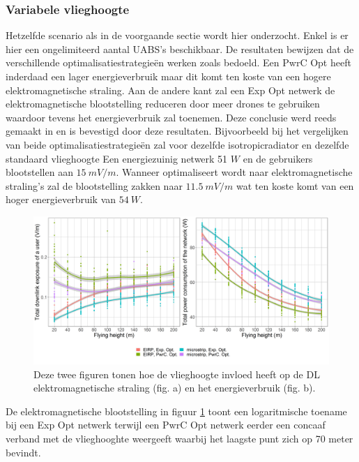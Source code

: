 \documentclass[twocolumn]{phdsymp_dutch}
\begin{document}
\subsubsection{Variabele vlieghoogte}
Hetzelfde scenario als in de voorgaande sectie wordt hier onderzocht. Enkel is er hier een ongelimiteerd aantal 
\gls{UABS}'s beschikbaar. De resultaten bewijzen dat de verschillende optimalisatiestrategie\"en werken zoals bedoeld.
Een \gls{PwrC Opt} heeft inderdaad een lager energieverbruik maar dit komt ten koste van een hogere elektromagnetische straling.
Aan de andere kant zal een  \gls{Exp Opt} netwerk de elektromagnetische blootstelling reduceren door meer drones te gebruiken waardoor tevens 
het energieverbruik zal toenemen. Deze conclusie werd reeds gemaakt in \cite{J1} en is bevestigd door deze resultaten.
Bijvoorbeeld bij het vergelijken van beide optimalisatiestrategieën zal voor dezelfde
\gls{isotropicradiator} en dezelfde standaard vlieghoogte Een energiezuinig netwerk 51 $W$ 
en de gebruikers blootstellen aan $15\ mV/m$.
Wanneer optimaliseert wordt naar elektromagnetische straling's zal de blootstelling zakken naar 
$11.5\ mV/m$ wat ten koste komt van een hoger energieverbruik van $54\ W$.


\begin{figure}[h!]
  \includegraphics[width=\linewidth]{../results/s3/fhvsdlAndPc.png}
  \caption{Deze twee figuren tonen hoe de vlieghoogte invloed heeft op de \acs{DL} elektromagnetische straling (fig. a) en het energieverbruik (fig. b).}
  \label{fig:s3a_dlAndPc}
\end{figure}

De elektromagnetische blootstelling in figuur \ref{fig:s3a_dlAndPc} toont een logaritmische toename bij een 
\gls{Exp Opt} netwerk terwijl een \gls{PwrC Opt} netwerk eerder een concaaf verband met de vlieghooghte weergeeft 
waarbij het laagste punt zich op 70 meter bevindt.
\end{document}
